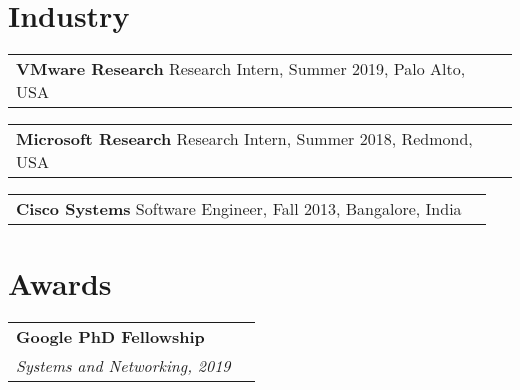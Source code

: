 \documentclass[margin,line]{res}
\begin{document}
\begin{resume}
\section{\sc Industry}

\begin{tabular}{@{}p{5.5in}p{4in}}
{\bf VMware Research} \dotfill Research Intern, Summer 2019, Palo Alto, USA\\
\end{tabular}

\vspace{-2.5pt}
\begin{tabular}{@{}p{5.5in}p{4in}}
{\bf Microsoft Research} \dotfill Research Intern, Summer 2018, Redmond, USA\\
\end{tabular}

\vspace{-2.5pt}
\begin{tabular}{@{}p{5.5in}p{4in}}
{\bf Cisco Systems} \dotfill Software Engineer, Fall 2013, Bangalore, India\\
\end{tabular}

\section{\sc Awards}
\begin{tabular}{@{}p{5.5in}p{4in}}
{\bf Google PhD Fellowship}\\
{\small\em Systems and Networking, 2019}\\
\end{tabular}

\end{resume}
\end{document}

